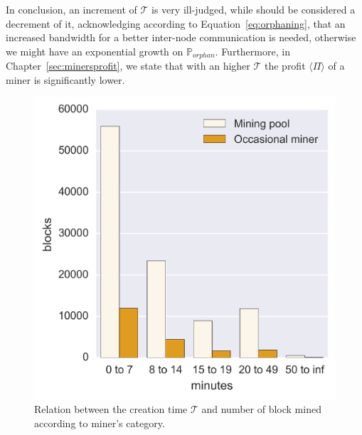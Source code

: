 \documentclass[USenglish]{uit-thesis}
\begin{document}
In conclusion, an increment of $\mathcal{T}$ is very ill-judged, while should
be considered a decrement of it, acknowledging according to
Equation~\ref{eq:orphaning}, that an increased bandwidth
for a better inter-node communication is needed, otherwise we
might have an exponential growth on $\mathbb{P}_{orphan}$.
Furthermore, in Chapter~\ref{sec:minersprofit}, we state that
with an higher $\mathcal{T}$ the profit $\langle \Pi \rangle$ of
a miner is significantly lower.
\begin{figure}[h]
	\centering
	\includegraphics[width=1\textwidth]{img/creation_time_miners}
	\caption{Relation between the creation time $\mathcal{T}$ and number of block mined according to miner's category.}
	\label{fig:creation_time_miners}
\end{figure}
\end{document}
